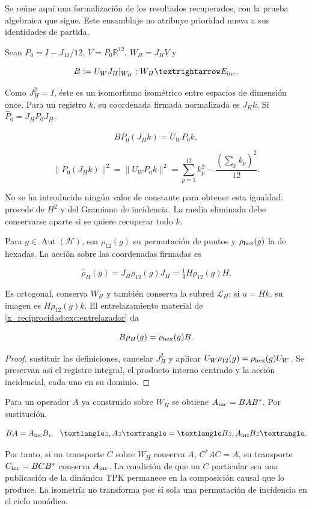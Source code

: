 Se reúne aquí una formalización de los resultados recuperados, con la prueba algebraica que sigue. Este ensamblaje no atribuye prioridad nueva a sus identidades de partida.

Sean \(P_0=I-J_{12}/12\), \(V=P_0\mathbb R^{12}\), \(W_H=J_HV\) y

\[
B:=U_WJ_H|_{W_H}:W_H\longrightarrow E_{\rm inc}.
\]

Como \(J_H^2=I\), éste es un isomorfismo isométrico entre espacios de dimensión once. Para un registro \(k\), su coordenada firmada normalizada es \(J_Hk\). Si \(\widehat P_0=J_HP_0J_H\),

\[
B\widehat P_0(J_Hk)=U_WP_0k,
\]

\[
\|\widehat P_0(J_Hk)\|^2
=\|U_WP_0k\|^2
=\sum_{p=1}^{12}k_p^2-\frac{(\sum_pk_p)^2}{12}.
\]

No se ha introducido ningún valor de constante para obtener esta igualdad: procede de \(H^2\) y del Gramiano de incidencia. La media eliminada debe conservarse aparte si se quiere recuperar todo \(k\).

Para \(g\in\operatorname{Aut}(\mathcal H)\), sea \(\rho_{12}(g)\) su permutación de puntos y \(\rho_{\rm hex}(g)\) la de hexadas. La acción sobre las coordenadas firmadas es

\[
\widehat\rho_H(g)=J_H\rho_{12}(g)J_H
=\tfrac14H\rho_{12}(g)H.
\]

Es ortogonal, conserva \(W_H\) y también conserva la subred \(\mathcal L_H\): si \(u=Hk\), su imagen es \(H\rho_{12}(g)k\). El entrelazamiento material de \cref{x_reciprocidad:exc:entrelazador} da

\[
B\widehat\rho_H(g)=\rho_{\rm hex}(g)B.
\]

\begin{proof}
sustituir las definiciones, cancelar \(J_H^2\) y aplicar \(U_W\rho_{12}(g)=\rho_{\rm hex}(g)U_W\). Se preservan así el registro integral, el producto interno centrado y la acción incidencial, cada uno en su dominio.
\end{proof}

Para un operador \(A\) ya construido sobre \(W_H\) se obtiene \(A_{\rm inc}=BAB^*\). Por sustitución,

\[
BA=A_{\rm inc}B,\quad
\langle z,Az\rangle=\langle Bz,A_{\rm inc}Bz\rangle.
\]

Por tanto, si un transporte \(C\) sobre \(W_H\) conserva \(A\), \(C^*AC=A\), su transporte \(C_{\rm inc}=BCB^*\) conserva \(A_{\rm inc}\). La condición de que un \(C\) particular sea una publicación de la dinámica TPK permanece en la composición causal que lo produce. La isometría no transforma por sí sola una permutación de incidencia en el ciclo nonádico.

